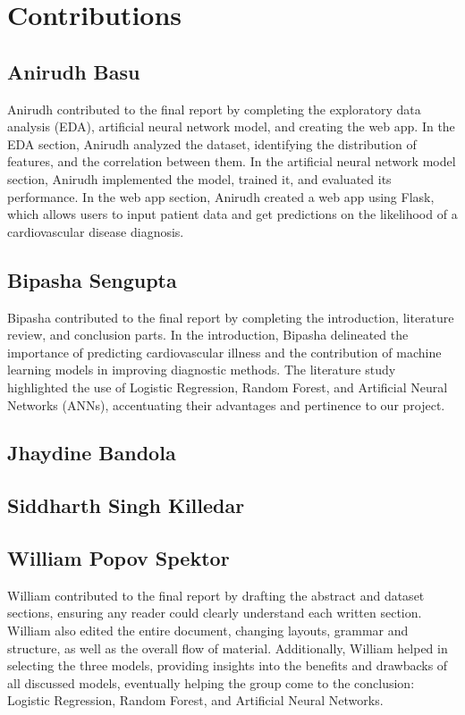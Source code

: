 \section{Contributions}

\subsection{Anirudh Basu}

Anirudh contributed to the final report by completing the exploratory data analysis (EDA), artificial neural network model, and creating the web app. In the EDA section, Anirudh analyzed the dataset, identifying the distribution of features, and the correlation between them. In the artificial neural network model section, Anirudh implemented the model, trained it, and evaluated its performance. In the web app section, Anirudh created a web app using Flask, which allows users to input patient data and get predictions on the likelihood of a cardiovascular disease diagnosis.

\subsection{Bipasha Sengupta}
Bipasha contributed to the final report by completing the introduction, literature review, and conclusion parts. In the introduction, Bipasha delineated the importance of predicting cardiovascular illness and the contribution of machine learning models in improving diagnostic methods. The literature study highlighted the use of Logistic Regression, Random Forest, and Artificial Neural Networks (ANNs), accentuating their advantages and pertinence to our project.

\subsection{Jhaydine Bandola}

\subsection{Siddharth Singh Killedar}

\subsection{William Popov Spektor}
William contributed to the final report by drafting the abstract and dataset sections, ensuring any reader could clearly understand each written section. William also edited the entire document, changing layouts, grammar and structure, as well as the overall flow of material. Additionally, William helped in selecting the three models, providing insights into the benefits and drawbacks of all discussed models, eventually helping the group come to the conclusion: Logistic Regression, Random Forest, and Artificial Neural Networks.